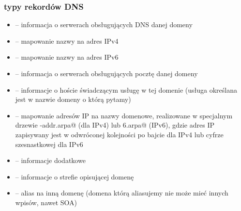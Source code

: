 \documentclass[12pt,aspectratio=169]{beamer}
\begin{document}
\begin{frame}[fragile]

\frametitle{typy rekordów DNS}

\begin{itemize}
	\item \Verb@NS@    – informacja o serwerach obsługujących DNS danej domeny
	\item \Verb@A@     – mapowanie nazwy na adres IPv4
	\item \Verb@AAAA@  – mapowanie nazwy na adres IPv6
	\item \Verb@MX@    – informacja o serwerach obsługujących pocztę danej domeny
	\item \Verb@SRV@   – informacje o hoście świadczącym usługę w tej domenie {\footnotesize (usługa określana jest w nazwie domeny o którą pytamy)}
	\item \Verb@PTR@   – mapowanie adresów IP na nazwy domenowe, {\footnotesize realizowane w specjalnym drzewie \Verb@in-addr.arpa@ (dla IPv4) lub \Verb@ip6.arpa@ (IPv6),
	                     gdzie adres IP zapisywany jest w odwróconej kolejności po bajcie dla IPv4 lub cyfrze szesnastkowej dla IPv6}
	\item \Verb@TXT@   – informacje dodatkowe
	\item \Verb@SOA@   – informacje o strefie opisującej domenę
	\item \Verb@CNAME@ – alias na inną domenę {\footnotesize (domena którą aliasujemy nie może mieć innych wpisów, nawet SOA)}
\end{itemize}

\end{frame}
\end{document}
